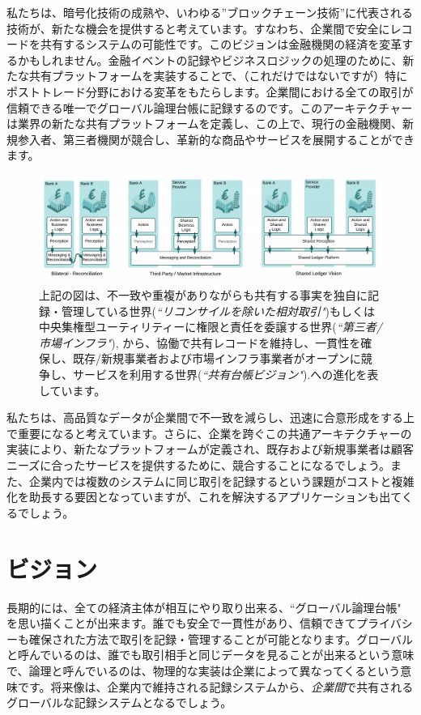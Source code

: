 \documentclass{article}
\begin{document}
私たちは、暗号化技術の成熟や、いわゆる”ブロックチェーン技術”に代表される技術が、新たな機会を提供すると考えています。すなわち、企業間で安全にレコードを共有するシステムの可能性です。このビジョンは金融機関の経済を変革するかもしれません。金融イベントの記録やビジネスロジックの処理のために、新たな共有プラットフォームを実装することで、（これだけではないですが）特にポストトレード分野における変革をもたらします。企業間における全ての取引が信頼できる唯一でグローバル論理台帳に記録するのです。このアーキテクチャーは業界の新たな共有プラットフォームを定義し、この上で、現行の金融機関、新規参入者、第三者機関が競合し、革新的な商品やサービスを展開することができます。
\begin{figure}[H]
\includegraphics[scale=.5, center]{sharedlogic}
\caption{上記の図は、不一致や重複がありながらも共有する事実を独自に記録・管理している世界(\textit{``リコンサイルを除いた相対取引"})もしくは中央集権型ユーティリティーに権限と責任を委譲する世界(\textit{``第三者/市場インフラ"}), から、協働で共有レコードを維持し、一貫性を確保し、既存/新規事業者および市場インフラ事業者がオープンに競争し、サービスを利用する世界(\textit{``共有台帳ビジョン"}).への進化を表しています。}
\end{figure}
私たちは、高品質なデータが企業間で不一致を減らし、迅速に合意形成をする上で重要になると考えています。さらに、企業を跨ぐこの共通アーキテクチャーの実装により、新たなプラットフォームが定義され、既存および新規事業者は顧客ニーズに合ったサービスを提供するために、競合することになるでしょう。また、企業内では複数のシステムに同じ取引を記録するという課題がコストと複雑化を助長する要因となっていますが、これを解決するアプリケーションも出てくるでしょう。
\section{ビジョン}
長期的には、全ての経済主体が相互にやり取り出来る、``グローバル論理台帳" を思い描くことが出来ます。誰でも安全で一貫性があり、信頼できてプライバシーも確保された方法で取引を記録・管理することが可能となります。グローバルと呼んでいるのは、誰でも取引相手と同じデータを見ることが出来るという意味で、論理と呼んでいるのは、物理的な実装は企業によって異なってくるという意味です。将来像は、企業内で維持される記録システムから、\textit{企業間}で共有されるグローバルな記録システムとなるでしょう。
\end{document}
